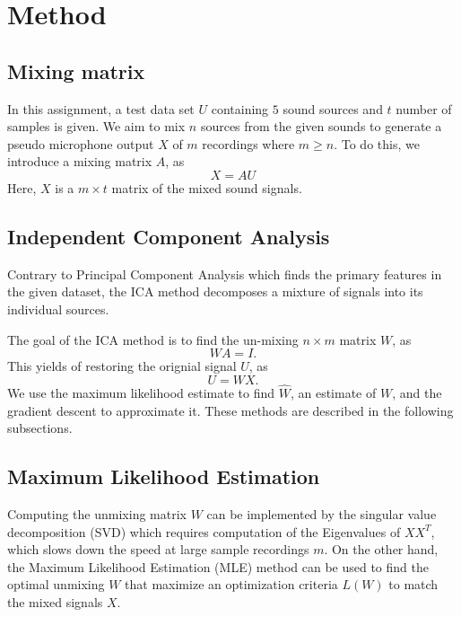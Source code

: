 \documentclass[conference]{IEEEtran}
\begin{document}
\section{Method}
\label{sec:method}

\subsection{Mixing matrix}

In this assignment, a test data set $U$ containing $5$ sound sources and $t$ number of samples is given. We aim to mix $n$ sources from the given sounds to generate a pseudo microphone output $X$ of $m$ recordings where $m\geq n$. To do this, we introduce a mixing matrix $A$, as
\begin{equation}
    X = AU
\end{equation}
Here, $X$ is a $m \times t$ matrix of the mixed sound signals.


\subsection{Independent Component Analysis}

Contrary to Principal Component Analysis which finds the primary features in the given dataset, the ICA method decomposes a mixture of signals into its individual sources. 

The goal of the ICA method is to find the un-mixing $n \times m$ matrix $W$, as
\begin{equation}
    WA = I.
\end{equation}
This yields of restoring the orignial signal $U$, as
\begin{equation}
    U = WX.
\end{equation}
We use the maximum likelihood estimate to find $\hat{W}$, an estimate of $W$, and the gradient descent to approximate it. These methods are described in the following subsections.


\subsection{Maximum Likelihood Estimation}

Computing the unmixing matrix $W$ can be implemented by the singular value decomposition (SVD) which requires computation of the Eigenvalues of $XX^T$, which slows down the speed at large sample recordings $m$.
On the other hand, the Maximum Likelihood Estimation (MLE) method can be used to find the optimal unmixing $W$ that maximize an optimization criteria $L(W)$ to match the mixed signals $X$.
\end{document}
